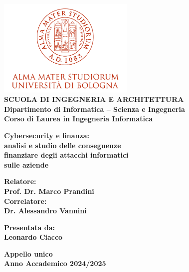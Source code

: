 \pagestyle{fancy}

\begin{titlepage}
\begin{center}
\includegraphics[width=2.56in]{figures/logo/logo_unibo.png}\\
\vspace{5mm}
{\small{\bf SCUOLA DI INGEGNERIA E ARCHITETTURA\\
\vspace{2mm}
Dipartimento di Informatica -- Scienza e Ingegneria\\
\vspace{2mm}
Corso di Laurea in Ingegneria Informatica }}
\end{center}
\vspace{3,8mm}
\begin{center}
{\LARGE{\bf Cybersecurity e finanza:\\
\vspace{3,5mm}
analisi e studio delle conseguenze\\
\vspace{3,5mm}
finanziare degli attacchi informatici\\
\vspace{3,5mm}
sulle aziende\\
\vspace{3,5mm}}}
  
\end{center}
\vspace{9,5mm}
\par
\noindent
\begin{minipage}[t]{0.47\textwidth}
{\normalsize{\bf Relatore:\\
Prof. Dr. Marco Prandini\\

Correlatore:\\
Dr. Alessandro Vannini}}
\end{minipage}
\hfill
\begin{minipage}[t]{0.47\textwidth}\raggedleft
{\normalsize{\bf Presentata da:\\
Leonardo Ciacco}}
\end{minipage}
\vspace{7,5mm} %
\begin{center}
{\normalsize{\bf Appello unico\\%
Anno Accademico 2024/2025}}%
\end{center}
\end{titlepage}
